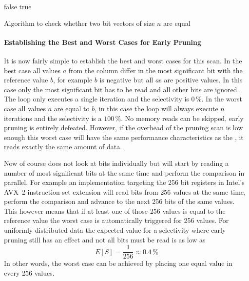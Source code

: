 \begin{algorithm}[h]
\begin{algorithmic}[1]
        \State \Return false
      \EndIf
    \EndFor
    \State \Return true
  \EndProcedure
\end{algorithmic}
\caption{Algorithm to check whether two bit vectors of size $n$ are equal}
\label{algo:equal}
\end{algorithm}

\paragraph{Establishing the Best and Worst Cases for Early Pruning}

It is now fairly simple to establish the best and worst cases for this scan. In
the best case all values $a$ from the column differ in the most significant bit
with the reference value $b$, for example $b$ is negative but all $a$s are
positive values. In this case only the most significant bit has to be read and
all other bits are ignored. The loop only executes a single iteration and the
selectivity is $0\,\%$. In the worst case all values $a$ are equal to $b$, in
this case the loop will always execute $n$ iterations and the selectivity is a
$100\,\%$. No memory reads can be skipped, early pruning is entirely defeated.
However, if the overhead of the pruning scan is low enough this worst case will
have the same performance characteristics as the \simdscan{}, it reads exactly
the same amount of data.


Now of course \bwv{} does not look at bits individually but will start by
reading a number of most significant bits at the same time and perform the
comparison in parallel. For example an implementation targeting the 256 bit
registers in Intel's AVX~2 instruction set extension will read bits from 256
values at the same time, perform the comparison and advance to the next 256 bits
of the same values. This however means that if at least one of those 256 values
is equal to the reference value the worst case is automatically triggered for
256 values. For uniformly distributed data the expected value for a selectivity
where early pruning still has an effect and not all bits must be read is as low
as $$E[S]=\frac{1}{256}\approx 0.4\,\%$$ In other words, the worst case can be
achieved by placing one equal value in every 256 values.

